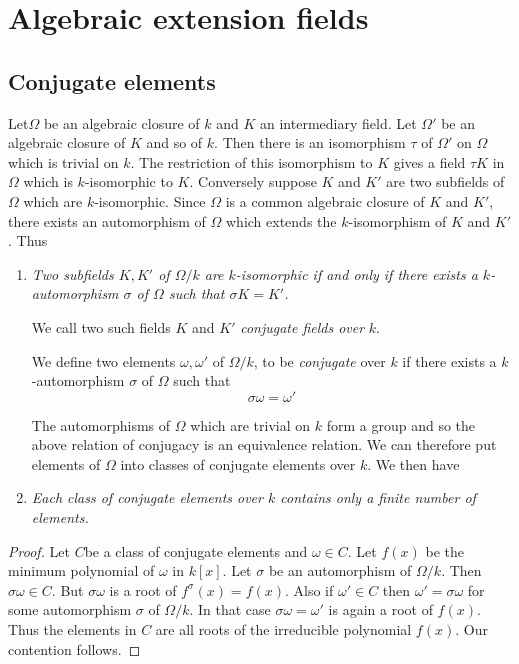  \chapter{Algebraic extension fields}\label{chap2}

\section{Conjugate elements}\label{c2:s1}%
 Let\pageoriginale $ \Omega$ be an algebraic closure of $k$ and $K$ an
 intermediary 
 field. Let $\Omega '$  be an algebraic  closure of $K$  and so of
 $k$. Then there is an isomorphism $\tau$ of  $ \Omega'$ on $ \Omega$
 which is trivial on $k$. The restriction of this isomorphism to $K$
 gives a field $ \tau K $ in $ \Omega$ which is $k$-isomorphic to
 $K$. Conversely suppose $K$ and $K'$  are two subfields of $ \Omega$
 which are $k$-isomorphic. Since $\Omega$ is a common algebraic closure
 of  $K$  and $K'$, there  exists an automorphism of  $ \Omega$ which
 extends  the $k$-isomorphism of $K$  and $K'$. Thus 
  \begin{enumerate}[1)]
\item \textit{Two subfields $K, K' $  of $ \Omega / k $  are
  $k$-isomorphic if and only if there exists a $k$-automorphism $ \sigma
  $ of $ \Omega$ such that  $ \sigma K = K'$.} 

We call two such fields $K$ and $K'$ \textit{conjugate fields over} $k$.

We  define two elements $ \omega, \omega' $  of  $ \Omega / k $, to be
\textit{conjugate} over $k$ if there  exists a $k$-automorphism
$\sigma$ of $ \Omega $ such that  
$$
\sigma \omega = \omega'
$$

 The automorphisms of $\Omega$ which are  trivial on $k$ form a group
 and  so the above relation of conjugacy is an equivalence
 relation. We can therefore put elements of $ \Omega$  into classes of
 conjugate elements over $k$. We then have  

 \item \textit{Each class of conjugate elements over $k$  contains
   only a finite number of elements.} 
\end{enumerate}  

\begin{proof}
Let $C$\pageoriginale be a class of  conjugate elements and  $ \omega
\in C $. Let 
$ f(x) $ be the minimum polynomial of $\omega $ in  $ k [ x ] $. Let $
\sigma $ be an automorphism of  $ \Omega / k $. Then $ \sigma \omega
\in C $. But $ \sigma \omega $ is a root of  $ f^\sigma (x) = f (x)
$. Also if  $ \omega' \in C $  then $ \omega' = \sigma \omega $ for
some  automorphism $ \sigma $ of  $ \Omega /k $. In  that  case $
\sigma \omega  = \omega' $ is  again a root of  $f (x)$. Thus the
elements in $C$ are all roots of the irreducible polynomial $f(x)
$. Our contention follows. 
  \end{proof}  
  
